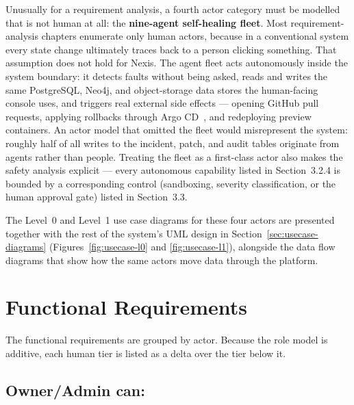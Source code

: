 Unusually for a requirement analysis, a fourth actor category must be modelled
that is not human at all: the \textbf{nine-agent self-healing fleet}. Most
requirement-analysis chapters enumerate only human actors, because in a
conventional system every state change ultimately traces back to a person
clicking something. That assumption does not hold for Nexis. The agent fleet
acts autonomously inside the system boundary: it detects faults without being
asked, reads and writes the same PostgreSQL, Neo4j, and object-storage data
stores the human-facing console uses, and triggers real external side effects
--- opening GitHub pull requests, applying rollbacks through Argo
CD~\cite{argocd}, and redeploying preview containers. An actor model that
omitted the fleet would misrepresent the system: roughly half of all writes to
the incident, patch, and audit tables originate from agents rather than
people. Treating the fleet as a first-class actor also makes the safety
analysis explicit --- every autonomous capability listed in Section~3.2.4 is
bounded by a corresponding control (sandboxing, severity classification, or
the human approval gate) listed in Section~3.3.

The Level~0 and Level~1 use case diagrams for these four actors are presented
together with the rest of the system's UML design in
Section~\ref{sec:usecase-diagrams} (Figures~\ref{fig:usecase-l0} and
\ref{fig:usecase-l1}), alongside the data flow diagrams that show how the same
actors move data through the platform.

\section{Functional Requirements}

The functional requirements are grouped by actor. Because the role model is
additive, each human tier is listed as a delta over the tier below it.

\subsection{Owner/Admin can:}

